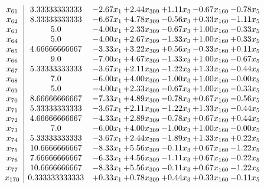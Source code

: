 \documentclass[8pt]{article}
\begin{document}
\[\begin{array}{c| c c@{\hskip 2pt} c@{\hskip 2pt} c@{\hskip 2pt} c@{\hskip 2pt} c@{\hskip 2pt} }
 x_{61}   &  3.33333333333 & -2.67 x_{1} & +  2.44 x_{309} & +  1.11 x_{3} & -0.67 x_{160} & -0.78 x_{5}\\
 x_{62}   &  8.33333333333 & -6.67 x_{1} & +  4.78 x_{309} & -0.56 x_{3} & +  0.33 x_{160} & -1.11 x_{5}\\
 x_{63}   &  5.0 & -4.00 x_{1} & +  2.33 x_{309} & -0.67 x_{3} & +  1.00 x_{160} & -0.33 x_{5}\\
 x_{64}   &  5.0 & -4.00 x_{1} & +  2.67 x_{309} & -1.33 x_{3} & +  1.00 x_{160} & +  0.33 x_{5}\\
 x_{65}   &  4.66666666667 & -3.33 x_{1} & +  3.22 x_{309} & +  0.56 x_{3} & -0.33 x_{160} & +  0.11 x_{5}\\
 x_{66}   &  9.0 & -7.00 x_{1} & +  4.67 x_{309} & -1.33 x_{3} & +  1.00 x_{160} & -0.67 x_{5}\\
 x_{67}   &  5.33333333333 & -3.67 x_{1} & +  2.11 x_{309} & -1.22 x_{3} & +  1.33 x_{160} & -0.44 x_{5}\\
 x_{68}   &  7.0 & -6.00 x_{1} & +  4.00 x_{309} & -1.00 x_{3} & +  1.00 x_{160} & -0.00 x_{5}\\
 x_{69}   &  5.0 & -4.00 x_{1} & +  2.33 x_{309} & -0.67 x_{3} & +  1.00 x_{160} & -0.33 x_{5}\\
 x_{70}   &  8.66666666667 & -7.33 x_{1} & +  4.89 x_{309} & -0.78 x_{3} & +  0.67 x_{160} & -0.56 x_{5}\\
 x_{71}   &  5.33333333333 & -3.67 x_{1} & +  2.11 x_{309} & -1.22 x_{3} & +  1.33 x_{160} & -0.44 x_{5}\\
 x_{72}   &  4.66666666667 & -4.33 x_{1} & +  2.89 x_{309} & -0.78 x_{3} & +  0.67 x_{160} & +  0.44 x_{5}\\
 x_{73}   &  7.0 & -6.00 x_{1} & +  4.00 x_{309} & -1.00 x_{3} & +  1.00 x_{160} & -0.00 x_{5}\\
 x_{74}   &  5.33333333333 & -3.67 x_{1} & +  2.44 x_{309} & -1.89 x_{3} & +  1.33 x_{160} & +  0.22 x_{5}\\
 x_{75}   &  10.6666666667 & -8.33 x_{1} & +  5.56 x_{309} & -0.11 x_{3} & +  0.67 x_{160} & -1.22 x_{5}\\
 x_{76}   &  7.66666666667 & -6.33 x_{1} & +  4.56 x_{309} & -1.11 x_{3} & +  0.67 x_{160} & -0.22 x_{5}\\
 x_{77}   &  10.6666666667 & -8.33 x_{1} & +  5.56 x_{309} & -0.11 x_{3} & +  0.67 x_{160} & -1.22 x_{5}\\
 x_{170}   &  0.333333333333 & +  0.33 x_{1} & +  0.78 x_{309} & +  0.44 x_{3} & +  0.33 x_{160} & -0.11 x_{5}\\

\end{array}\]
\end{document}
